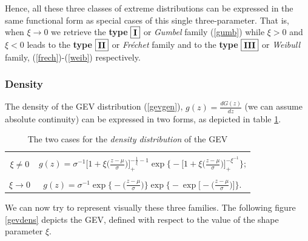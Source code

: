 \documentclass[11pt,a4paper,openany ]{book}
\begin{document}


Hence, all these three classes of extreme distributions can be expressed in the same functional form as special cases of this single three-parameter. That is, when $\xi\rightarrow 0$ we retrieve the \textbf{type} $\boxed{\textbf{\text{I}}}$ or \emph{Gumbel} family (\ref{gumb}) while $\xi >0$ and $\xi <0$ leads to the \textbf{type} $\boxed{\textbf{\text{II}}}$  or \emph{Fréchet} family and to the \textbf{type} $\boxed{\textbf{\text{III}}}$ or \emph{Weibull} family, (\ref{frech})-(\ref{weib}) respectively. 



\subsubsection*{Density} 
The density of the GEV distribution (\ref{gevgen}), $g(z)=\frac{d G(z)}{dz}$ (we can assume absolute continuity) can be expressed in two forms, as depicted in table \ref{tab:gevdens}.

\begin{table}[!htb]
\centering\caption{The two cases for the \emph{density distribution} of the GEV}\label{tab:gevdens}
\begin{tabular}{|c|c}
\hline \\
$\xi\neq 0$ &  $g(z)=\sigma^{-1}\bigg[1+\xi\bigg(\frac{z-\mu}{\sigma}\bigg)\bigg]_+^{-\frac{1}{\xi}-1}\exp\Bigg\{-\bigg[1+\xi\bigg(\frac{z-\mu}{\sigma}\bigg)\bigg]_+^{-\xi^{-1}}\Bigg\}$; \\
 \hline  \\
$\xi\to 0$ & $g(z)= \sigma^{-1}\exp\bigg\{-\bigg(\frac{z-\mu}{\sigma}\bigg)\bigg\}\exp\Bigg\{-\exp\bigg[-\bigg(\frac{z-\mu}{\sigma}\bigg)\bigg]\Bigg\}$. \\ 
\hline 
\end{tabular}
\end{table}

We can now try to represent visually these three families. The following figure \ref{gevdens} depicts the GEV, defined with respect to the value of the shape parameter $\xi$.
\end{document}
